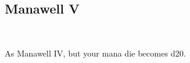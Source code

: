 \subsection*{Manawell V}\label{feat:manawell5}
 \\

As Manawell IV, but your mana die becomes d20.

